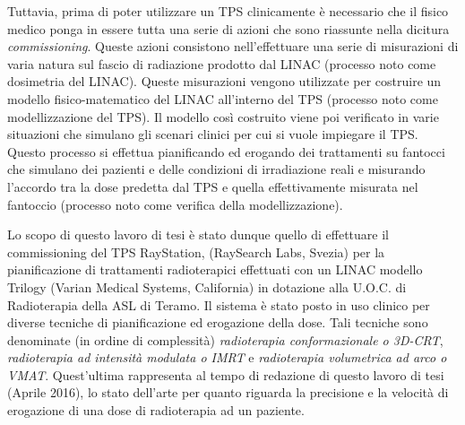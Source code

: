Tuttavia, prima di poter utilizzare un TPS clinicamente è necessario che il fisico medico ponga in essere tutta una serie di azioni che sono riassunte nella dicitura \textit{commissioning}. Queste azioni consistono nell'effettuare una serie di misurazioni di varia natura sul fascio di radiazione prodotto dal LINAC (processo noto come dosimetria del LINAC). Queste misurazioni vengono utilizzate per costruire un modello fisico-matematico del LINAC all'interno del TPS (processo noto come modellizzazione del TPS). Il modello così costruito viene poi verificato in varie situazioni che simulano gli scenari clinici per cui si vuole impiegare il TPS. Questo processo si effettua pianificando ed erogando dei trattamenti su fantocci che simulano dei pazienti e delle condizioni di irradiazione reali e misurando l'accordo tra la dose predetta dal TPS e quella effettivamente misurata nel fantoccio (processo noto come verifica della modellizzazione).

Lo scopo di questo lavoro di tesi è stato dunque quello di effettuare il commissioning del TPS RayStation, (RaySearch Labs, Svezia) per la pianificazione di trattamenti radioterapici effettuati con un LINAC modello Trilogy (Varian Medical Systems, California) in dotazione alla U.O.C. di Radioterapia della ASL di Teramo. Il sistema è stato posto in uso clinico per diverse tecniche di pianificazione ed erogazione della dose. Tali tecniche sono denominate (in ordine di complessità) \textit{radioterapia conformazionale o 3D-CRT}, \textit{radioterapia ad intensità modulata o IMRT} e \textit{radioterapia volumetrica ad arco o VMAT}. Quest'ultima rappresenta al tempo di redazione di questo lavoro di tesi (Aprile 2016), lo stato dell'arte per quanto riguarda la precisione e la velocità di erogazione di una dose di radioterapia ad un paziente.

